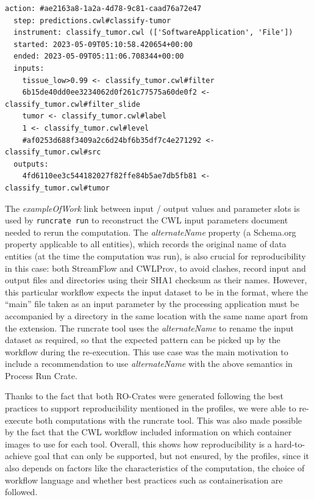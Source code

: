\begin{listing}
\begin{footnotesize}
\begin{verbatim}
action: #ae2163a8-1a2a-4d78-9c81-caad76a72e47
  step: predictions.cwl#classify-tumor
  instrument: classify_tumor.cwl (['SoftwareApplication', 'File'])
  started: 2023-05-09T05:10:58.420654+00:00
  ended: 2023-05-09T05:11:06.708344+00:00
  inputs:
    tissue_low>0.99 <- classify_tumor.cwl#filter
    6b15de40dd0ee3234062d0f261c77575a60de0f2 <- classify_tumor.cwl#filter_slide
    tumor <- classify_tumor.cwl#label
    1 <- classify_tumor.cwl#level
    #af0253d688f3409a2c6d24bf6b35df7c4e271292 <- classify_tumor.cwl#src
  outputs:
    4fd6110ee3c544182027f82ffe84b5ae7db5fb81 <- classify_tumor.cwl#tumor
\end{verbatim}
\end{footnotesize}
\end{listing}


The \emph{exampleOfWork} link between input / output values and parameter slots is used by \texttt{runcrate run} to reconstruct the CWL input parameters document needed to rerun the computation.
The
\emph{alternateName} property (a Schema.org property applicable to all entities), which records the original name of data entities (at the time the computation was run), is also crucial for reproducibility in this case: both StreamFlow and CWLProv, to avoid clashes, record input and output files and directories using their SHA1
checksum as their names. 
However, this particular workflow expects the input dataset to be in the  format, where the ``main'' file taken as an input parameter by the processing application must be accompanied by a directory in the same location with the same name apart from the extension.
The runcrate tool uses the \emph{alternateName} to rename the input dataset as required, so that the expected pattern can be picked up by the workflow during the re-execution.
This use case was the main motivation to include a recommendation to use \emph{alternateName} with the above semantics in Process Run Crate.

Thanks to the fact that both RO-Crates were generated following the best practices to support reproducibility mentioned in the profiles, we were able to re-execute both computations with the runcrate tool.
This was also made possible by the fact that the CWL workflow included information on which container images to use for each tool.
Overall, this shows how reproducibility is a hard-to-achieve goal that can only be supported, but not ensured, by the profiles, since it also depends on factors like the characteristics of the computation, the choice of workflow language and whether best practices such as containerisation are followed.

